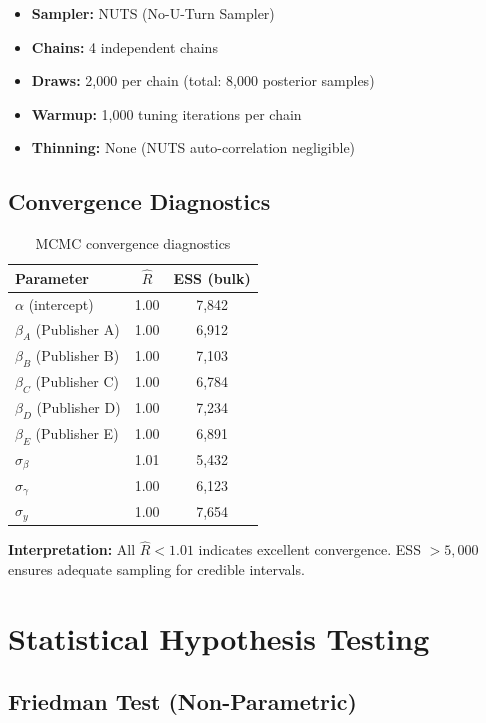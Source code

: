 \documentclass[11pt,a4paper]{article}
\begin{document}
\begin{itemize}
    \item \textbf{Sampler:} NUTS (No-U-Turn Sampler)
    \item \textbf{Chains:} 4 independent chains
    \item \textbf{Draws:} 2,000 per chain (total: 8,000 posterior samples)
    \item \textbf{Warmup:} 1,000 tuning iterations per chain
    \item \textbf{Thinning:} None (NUTS auto-correlation negligible)
\end{itemize}

\subsection{Convergence Diagnostics}

\begin{table}[H]
\centering
\caption{MCMC convergence diagnostics}
\begin{tabular}{lcc}
\toprule
\textbf{Parameter} & \textbf{$\hat{R}$} & \textbf{ESS (bulk)} \\
\midrule
$\alpha$ (intercept) & 1.00 & 7,842 \\
$\beta_A$ (Publisher A) & 1.00 & 6,912 \\
$\beta_B$ (Publisher B) & 1.00 & 7,103 \\
$\beta_C$ (Publisher C) & 1.00 & 6,784 \\
$\beta_D$ (Publisher D) & 1.00 & 7,234 \\
$\beta_E$ (Publisher E) & 1.00 & 6,891 \\
$\sigma_\beta$ & 1.01 & 5,432 \\
$\sigma_\gamma$ & 1.00 & 6,123 \\
$\sigma_y$ & 1.00 & 7,654 \\
\bottomrule
\end{tabular}
\label{tab:mcmc-diagnostics}
\end{table}

\textbf{Interpretation:} All $\hat{R} < 1.01$ indicates excellent convergence. ESS $> 5,000$ ensures adequate sampling for credible intervals.

\section{Statistical Hypothesis Testing}

\subsection{Friedman Test (Non-Parametric)}
\end{document}
